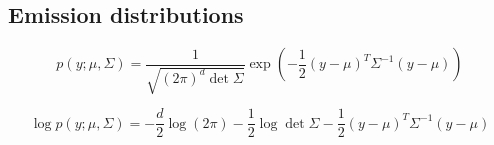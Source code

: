 \documentclass[a4paper, 11pt]{article}
\begin{document}
\subsection{Emission distributions}

\begin{displaymath}
  p(y ; \mu, \Sigma) = \dfrac{1}{\sqrt{(2 \pi)^d \det{\Sigma}}}
  \exp{
    \left(
    -\dfrac{1}{2}
      (y - \mu)^T \Sigma^{-1} (y - \mu)
    \right)
  }
\end{displaymath}

\begin{displaymath}
  \log{p(y ; \mu, \Sigma)} =
  - \dfrac{d}{2} \log(2 \pi)
  - \dfrac{1}{2} \log\det{\Sigma}
  - \dfrac{1}{2} (y - \mu)^T \Sigma^{-1} (y - \mu)
\end{displaymath}






\newpage

\end{document}
